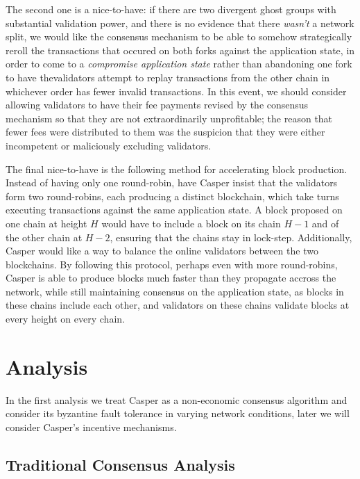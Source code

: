 \documentclass[11pt,a4paper]{article}
\begin{document}
The second one is a nice-to-have: if there are two divergent ghost groups with substantial validation power, and there is no evidence that there \emph{wasn't} a network split, we would like the consensus mechanism to be able to somehow strategically reroll the transactions that occured on both forks against the application state, in order to come to a \emph{compromise application state} rather than abandoning one fork to have thevalidators attempt to replay transactions from the other chain in whichever order has fewer invalid transactions. In this event, we should consider allowing validators to have their fee payments revised by the consensus mechanism so that they are not extraordinarily unprofitable; the reason that fewer fees were distributed to them was the suspicion that they were either incompetent or maliciously excluding validators. 

The final nice-to-have is the following method for accelerating block production. Instead of having only one round-robin, have Casper insist that the validators form two round-robins, each producing a distinct blockchain, which take turns executing transactions against the same application state. A block proposed on one chain at height $H$ would have to include a block on its chain $H-1$ and of the other chain at $H-2$, ensuring that the chains stay in lock-step. Additionally, Casper would like a way to balance the online validators between the two blockchains. By following this protocol, perhaps even with more round-robins, Casper is able to produce blocks much faster than they propagate accross the network, while still maintaining consensus on the application state, as blocks in these chains include each other, and validators on these chains validate blocks at every height on every chain. 

\section{Analysis}

In the first analysis we treat Casper as a non-economic consensus algorithm and consider its byzantine fault tolerance in varying network conditions, later we will consider Casper's incentive mechanisms. 

\subsection{Traditional Consensus Analysis}
\end{document}
